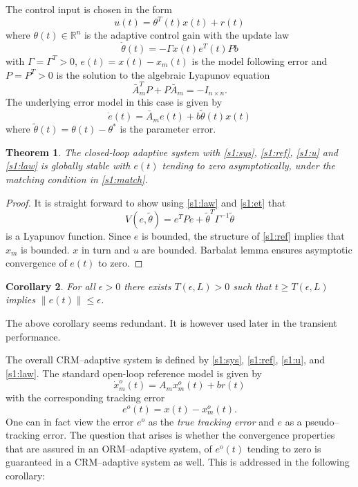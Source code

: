 \documentclass[10pt,journal]{IEEEtran}
\theoremstyle{plain}%
\newtheorem{thm}{Theorem}%
\newtheorem{cor}[thm]{Corollary}
\theoremstyle{definition}
\newcommand{\be}[0]{\begin{equation}}
\newcommand{\ee}[0]{\end{equation}}
\newcommand{\norms}[1]{\lVert#1\rVert}
\newcommand{\normB}[0]{\norms}
\let\norm=\normB
\renewcommand{\Re}[0]{\mathbb R}
\begin{document}
The control input is chosen in the form
\be\label{s1:u}
u(t)= \theta^T(t) x(t) + r(t)
\ee
where $\theta(t) \in \Re^n$ is the adaptive control gain with the update law
\be\label{s1:law}
\dot \theta(t) = -\Gamma x(t)e^T(t) Pb
\ee
with ${\Gamma = \Gamma^T>0}$, ${e(t)= x(t)-x_m(t)}$ is the model following error and $P=P^T>0$ is the solution to the algebraic Lyapunov equation
\be
\label{s1:lyap}\bar A_m^TP+P \bar A_m = -I_{n\times n}. 
\ee
The underlying error model in this case is given by
\be\dot e(t)= \bar A_m e(t) + b \tilde\theta(t)x(t)   \label{s1:et}\ee
where ${\tilde\theta(t)=\theta(t)-\theta^*}$ is the parameter error.


\begin{thm}\label{thm:simple}
The closed-loop adaptive system with \eqref{s1:sys}, \eqref{s1:ref}, \eqref{s1:u} and \eqref{s1:law} is globally stable with $e(t)$ tending to zero asymptotically, under the matching condition in \eqref{s1:match}.
\end{thm}
\begin{proof} It is straight forward to show using \eqref{s1:law} and \eqref{s1:et} that
\be\label{can}
V(e,\tilde\theta) = e^TPe + \tilde \theta^T \Gamma^{-1} \tilde \theta
\ee
is a Lyapunov function. Since $e$ is bounded, the structure of \eqref{s1:ref} implies that $x_m$ is bounded. $x$ in turn and $u$ are bounded. Barbalat  lemma ensures asymptotic convergence of $e(t)$ to zero. \end{proof}

\begin{cor}\label{Tdef}
For all $\epsilon>0$ there exists $T(\epsilon,L)>0$ such that $t\geq T(\epsilon,L)$ implies $\norm{e(t)}\leq \epsilon$.
\end{cor}
\noindent The above corollary seems redundant. It is however used later in the transient performance.
%
%

The overall CRM--adaptive system is defined by \eqref{s1:sys}, \eqref{s1:ref}, \eqref{s1:u}, and \eqref{s1:law}.  The standard open-loop reference model is given by 
\be\dot x_m^o(t) = A_m x_m^o(t) + b r(t) \label{eo}\ee
with the corresponding tracking error 
\be e^o(t) =  x(t) - x_m^o(t) \label{eodef}. \ee
One can in fact view the error $e^o$ as the {\em true tracking error} and $e$ as a pseudo--tracking error. The question that arises is whether the convergence properties that are assured in an ORM--adaptive system, of $e^o(t)$ tending to zero is guaranteed in a CRM--adaptive system as well. This is addressed in the following corollary:
\end{document}
